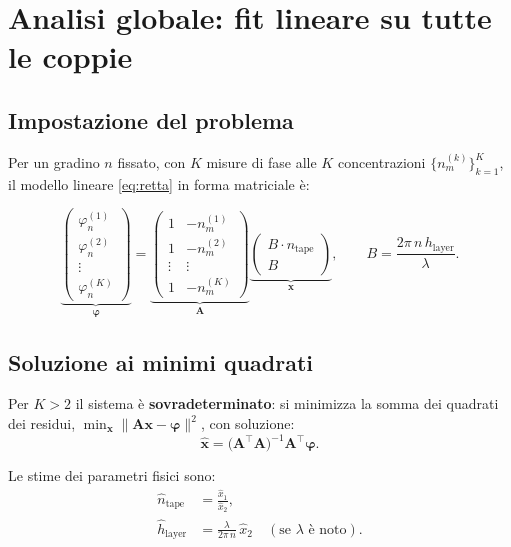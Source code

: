 \section{Analisi globale: fit lineare su tutte le coppie}

\subsection{Impostazione del problema}

Per un gradino $n$ fissato, con $K$ misure di fase alle $K$ concentrazioni
$\{n_m^{(k)}\}_{k=1}^K$, il modello lineare \eqref{eq:retta} in forma
matriciale è:

\[
\underbrace{
\begin{pmatrix} \varphi_n^{(1)} \\ \varphi_n^{(2)} \\ \vdots \\ \varphi_n^{(K)} \end{pmatrix}
}_{\boldsymbol{\varphi}}
=
\underbrace{
\begin{pmatrix} 1 & -n_m^{(1)} \\ 1 & -n_m^{(2)} \\ \vdots & \vdots \\ 1 & -n_m^{(K)} \end{pmatrix}
}_{\mathbf{A}}
\underbrace{
\begin{pmatrix} B\cdot n_\text{tape} \\ B \end{pmatrix}
}_{\mathbf{x}},
\qquad B = \frac{2\pi\,n\,h_\text{layer}}{\lambda}.
\]

\subsection{Soluzione ai minimi quadrati}

Per $K > 2$ il sistema è \textbf{sovradeterminato}: si minimizza la somma dei
quadrati dei residui, $\min_{\mathbf{x}} \|\mathbf{A}\mathbf{x} - \boldsymbol{\varphi}\|^2$,
con soluzione:
\[
  \hat{\mathbf{x}} = \bigl(\mathbf{A}^\top \mathbf{A}\bigr)^{-1}
  \mathbf{A}^\top \boldsymbol{\varphi}.
\]

Le stime dei parametri fisici sono:
\begin{align*}
  \hat{n}_\text{tape} &= \frac{\hat{x}_1}{\hat{x}_2}, \\[4pt]
  \hat{h}_\text{layer} &= \frac{\lambda}{2\pi\,n}\,\hat{x}_2
  \quad (\text{se }\lambda\text{ è noto}).
\end{align*}



